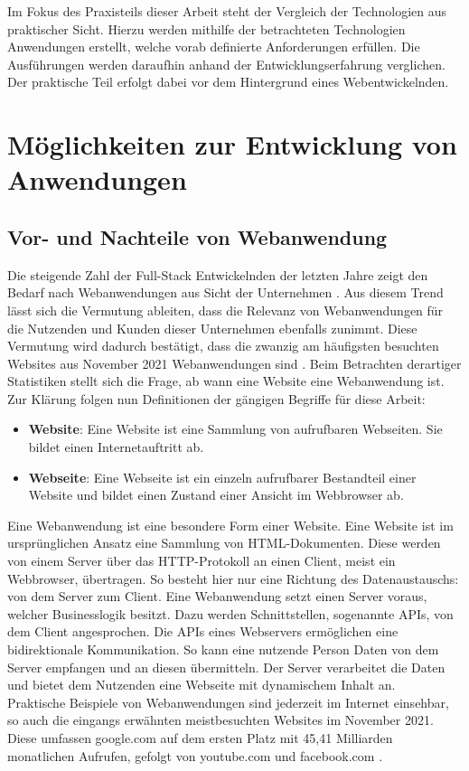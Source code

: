 \documentclass[a4paper]{scrartcl}
\begin{document}
 Im Fokus des Praxisteils dieser Arbeit steht der Vergleich der Technologien aus praktischer Sicht. Hierzu werden mithilfe der betrachteten Technologien Anwendungen erstellt, welche vorab definierte Anforderungen erfüllen. Die Ausführungen werden daraufhin anhand der Entwicklungserfahrung verglichen. Der praktische Teil erfolgt dabei vor dem Hintergrund eines Webentwickelnden.  

\newpage

\section{Möglichkeiten zur Entwicklung von Anwendungen}

\subsection{Vor- und Nachteile von Webanwendung}

Die steigende Zahl der Full-Stack Entwickelnden der letzten Jahre zeigt den Bedarf nach Webanwendungen aus Sicht der Unternehmen \autocite{stackoverflow_2020}. Aus diesem Trend lässt sich die Vermutung ableiten, dass die Relevanz von Webanwendungen für die Nutzenden und Kunden dieser Unternehmen ebenfalls zunimmt. Diese Vermutung wird dadurch bestätigt, dass die zwanzig am häufigsten besuchten Websites aus November 2021 Webanwendungen sind \autocite{Clement}. Beim Betrachten derartiger Statistiken stellt sich die Frage, ab wann eine Website eine Webanwendung ist. Zur Klärung folgen nun Definitionen der gängigen Begriffe für diese Arbeit: 

\begin{itemize}
	\item[] \textbf{Website}: Eine Website ist eine Sammlung von aufrufbaren Webseiten. Sie bildet einen Internetauftritt ab.
	\item[] \textbf{Webseite}: Eine Webseite ist ein einzeln aufrufbarer Bestandteil einer Website und bildet einen Zustand einer Ansicht im Webbrowser ab.
\end{itemize}

Eine Webanwendung ist eine besondere Form einer Website. Eine Website ist im ursprünglichen Ansatz eine Sammlung von HTML-Dokumenten. Diese werden von einem Server über das HTTP-Protokoll an einen Client, meist ein Webbrowser, übertragen. So besteht hier nur eine Richtung des Datenaustauschs: von dem Server zum Client. Eine Webanwendung setzt einen Server voraus, welcher Businesslogik besitzt. Dazu werden Schnittstellen, sogenannte APIs, von dem Client angesprochen. Die APIs eines Webservers ermöglichen eine bidirektionale Kommunikation. So kann eine nutzende Person Daten von dem Server empfangen und an diesen übermitteln. Der Server verarbeitet die Daten und bietet dem Nutzenden eine Webseite mit dynamischem Inhalt an. \\
Praktische Beispiele von Webanwendungen sind jederzeit im Internet einsehbar, so auch die eingangs erwähnten meistbesuchten Websites im November 2021. Diese umfassen google.com auf dem ersten Platz mit 45,41 Milliarden monatlichen Aufrufen, gefolgt von youtube.com und facebook.com \autocite{Clement}. \\
\end{document}
